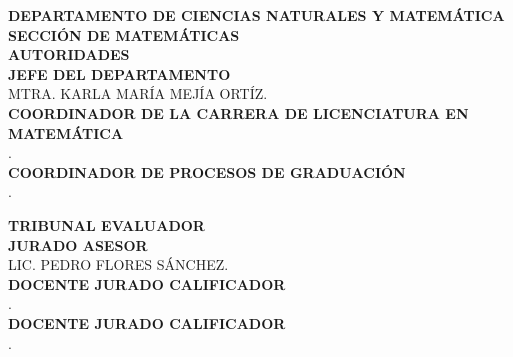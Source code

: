\begin{center}
	\newpage 
	\thispagestyle{empty}%
	\begin{large}
		\textbf{
			DEPARTAMENTO DE CIENCIAS NATURALES Y MATEMÁTICA\\
			\vspace{0.5in} 
			SECCIÓN DE MATEMÁTICAS\\
			\vspace{0.8in}
			AUTORIDADES\\
			\vspace{1.5in}	
		}
		\textbf{JEFE DEL DEPARTAMENTO}\\
		MTRA. KARLA MARÍA MEJÍA ORTÍZ.\\
		\vspace{1.0in}
		\textbf{COORDINADOR DE LA CARRERA DE LICENCIATURA EN MATEMÁTICA}\\
		.\\
		\vspace{1.0in}
		\textbf{COORDINADOR DE PROCESOS DE GRADUACIÓN}\\
		.\\
	\end{large}
	\newpage
	\thispagestyle{empty}%
	\begin{large}
		\textbf{TRIBUNAL EVALUADOR}\\
		\vspace{1.5in}
		\textbf{JURADO ASESOR}\\
		LIC. PEDRO FLORES SÁNCHEZ.\\
		\vspace{2.0in}
		\textbf{DOCENTE JURADO CALIFICADOR}\\
		.\\
		\vspace{2.0in}
		\textbf{DOCENTE JURADO CALIFICADOR}\\
		.\\	
	\end{large}
\end{center}
